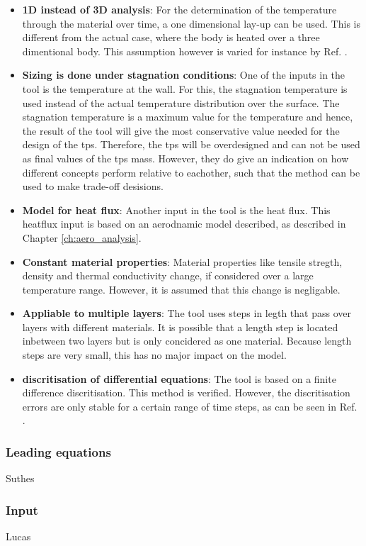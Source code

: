 \begin{itemize}
\item \textbf{1D instead of 3D analysis}: For the determination of the temperature through the material over time, a one dimensional lay-up can be used. This is different from the actual case, where the body is heated over a three dimentional body. This assumption however is varied for instance by Ref. \cite{Corso2009}.
\item \textbf{Sizing is done under stagnation conditions}: One of the inputs in the tool is the temperature at the wall. For this, the stagnation temperature is used instead of the actual temperature distribution over the surface. The stagnation temperature is a maximum value for the temperature and hence, the result of the tool will give the most conservative value needed for the design of the \gls{tps}. Therefore, the \gls{tps} will be overdesigned and can not be used as final values of the \gls{tps} mass. However, they do give an indication on how different concepts perform relative to eachother, such that the method can be used to make trade-off desisions.
\item \textbf{Model for heat flux}: Another input in the tool is the heat flux. This heatflux input is based on an aerodnamic model described, as described in Chapter \ref{ch:aero_analysis}.
\item \textbf{Constant material properties}: Material properties like tensile stregth, density and thermal conductivity change, if considered over a large temperature range. However, it is assumed that this change is negligable. 
\item \textbf{Appliable to multiple layers}: The tool uses steps in legth that pass over layers with different materials. It is possible that a length step is located inbetween two layers but is only concidered as one material. Because length steps are very small, this has no major impact on the model.
\item \textbf{discritisation of differential equations}: The tool is based on a finite difference discritisation. This method is verified. However, the discritisation errors are only stable for a certain range of time steps, as can be seen in Ref. \cite{Smith2011}. 
\end{itemize}

\subsubsection{Leading equations}
Suthes
\subsubsection{Input}
Lucas
